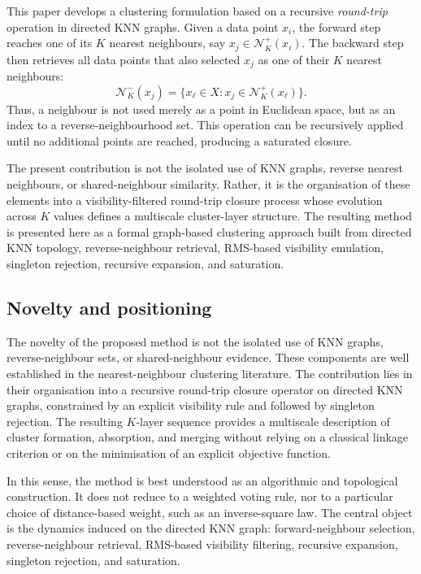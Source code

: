 \documentclass[pdflatex,sn-mathphys-num]{sn-jnl}
\newcommand{\calN}{\mathcal{N}}
\begin{document}
This paper develops a clustering formulation based on a recursive \emph{round-trip} operation in directed KNN graphs. Given a data point $x_i$, the forward step reaches one of its $K$ nearest neighbours, say $x_j\in\calN_K^+(x_i)$. The backward step then retrieves all data points that also selected $x_j$ as one of their $K$ nearest neighbours:
\begin{equation}
\calN_K^-(x_j)=\{x_\ell\in X: x_j\in\calN_K^+(x_\ell)\}.
\end{equation}
Thus, a neighbour is not used merely as a point in Euclidean space, but as an index to a reverse-neighbourhood set. This operation can be recursively applied until no additional points are reached, producing a saturated closure.

The present contribution is not the isolated use of KNN graphs, reverse nearest neighbours, or shared-neighbour similarity. Rather, it is the organisation of these elements into a visibility-filtered round-trip closure process whose evolution across $K$ values defines a multiscale cluster-layer structure. The resulting method is presented here as a formal graph-based clustering approach built from directed KNN topology, reverse-neighbour retrieval, RMS-based visibility emulation, singleton rejection, recursive expansion, and saturation.

\subsection{Novelty and positioning}

The novelty of the proposed method is not the isolated use of KNN graphs, reverse-neighbour sets, or shared-neighbour evidence. These components are well established in the nearest-neighbour clustering literature. The contribution lies in their organisation into a recursive round-trip closure operator on directed KNN graphs, constrained by an explicit visibility rule and followed by singleton rejection. The resulting $K$-layer sequence provides a multiscale description of cluster formation, absorption, and merging without relying on a classical linkage criterion or on the minimisation of an explicit objective function.

In this sense, the method is best understood as an algorithmic and topological construction. It does not reduce to a weighted voting rule, nor to a particular choice of distance-based weight, such as an inverse-square law. The central object is the dynamics induced on the directed KNN graph: forward-neighbour selection, reverse-neighbour retrieval, RMS-based visibility filtering, recursive expansion, singleton rejection, and saturation.
\end{document}
